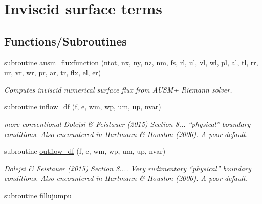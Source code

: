 \hypertarget{group__isurf}{\section{Inviscid surface terms}
\label{group__isurf}
}
\subsection*{Functions/\-Subroutines}
\begin{DoxyCompactItemize}
\item 
\hypertarget{group__isurf_ga2b8162e02f3f2266c59f717fa1363226}{subroutine \hyperlink{group__isurf_ga2b8162e02f3f2266c59f717fa1363226}{ausm\-\_\-fluxfunction} (ntot, nx, ny, nz, nm, fs, rl, ul, vl, wl, pl, al, tl, rr, ur, vr, wr, pr, ar, tr, flx, el, er)}\label{group__isurf_ga2b8162e02f3f2266c59f717fa1363226}

\begin{DoxyCompactList}\small\item\em Computes inviscid numerical surface flux from A\-U\-S\-M+ Riemann solver. \end{DoxyCompactList}\item 
subroutine \hyperlink{group__isurf_ga15e4fb7f0dbe0767ef81c6b291f611cb}{inflow\-\_\-df} (f, e, wm, wp, um, up, nvar)
\begin{DoxyCompactList}\small\item\em more conventional Dolejsi \& Feistauer (2015) Section 8... ``physical'' boundary conditions. Also encountered in Hartmann \& Houston (2006). A poor default. \end{DoxyCompactList}\item 
subroutine \hyperlink{group__isurf_ga0293ec162f23a55a9e89cf0797cbf2b2}{outflow\-\_\-df} (f, e, wm, wp, um, up, nvar)
\begin{DoxyCompactList}\small\item\em Dolejsi \& Feistauer (2015) Section 8.... Very rudimentary ``physical'' boundary conditions. Also encountered in Hartmann \& Houston (2006). A poor default. \end{DoxyCompactList}\item 
\hypertarget{group__isurf_gaecf15d43e4c71d130e4ef9e4a6a7821a}{subroutine \hyperlink{group__isurf_gaecf15d43e4c71d130e4ef9e4a6a7821a}{fillujumpu}}\label{group__isurf_gaecf15d43e4c71d130e4ef9e4a6a7821a}


\end{DoxyCompactItemize}
